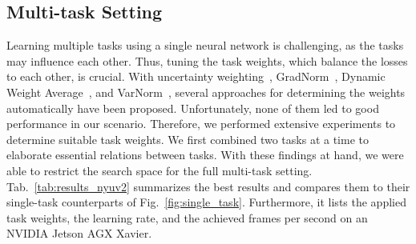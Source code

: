 \documentclass[conference]{IEEEtran}
\begin{document}
\subsection{Multi-task Setting}
\label{sec:experiments:multi_task}
Learning multiple tasks using a single neural network is challenging, as the tasks may influence each other.
Thus, tuning the task weights, which balance the losses to each other, is crucial. 
With uncertainty weighting~\cite{UncertaintyWeighting-cvpr2018}, GradNorm~\cite{GradNorm-icml2018}, Dynamic Weight Average~\cite{DynamicWeightAverage-cvpr2019}, and VarNorm~\cite{VarNorm-ral2021}, several approaches for determining the weights automatically have been proposed.
Unfortunately, none of them led to good performance in our scenario.
Therefore, we performed extensive experiments to determine suitable task weights.
We first combined two tasks at a time to elaborate essential relations between tasks. 
With these findings at hand, we were able to restrict the search space for the full multi-task setting.
Tab.~\ref{tab:results_nyuv2} summarizes the best results and compares them to their single-task counterparts of Fig.~\ref{fig:single_task}.
Furthermore, it lists the applied task weights, the learning rate, and the achieved frames per second on an NVIDIA Jetson AGX Xavier.
\end{document}
